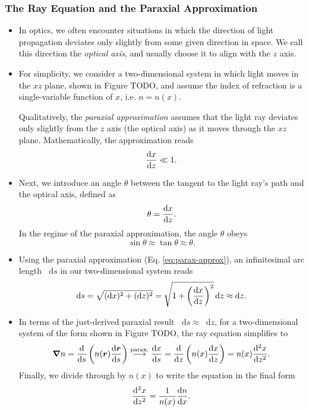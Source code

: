 \documentclass[11pt, a4paper]{article}
\newcommand{\diff}{\mathop{}\!\mathrm{d}} %
\renewcommand{\vec}[1]{\bm{#1}} %
\renewcommand{\r}{\vec{r}}  %
\begin{document}
\subsubsection{The Ray Equation and the Paraxial Approximation}
\begin{itemize}
    \item In optics, we often encounter situations in which the direction of light propagation deviates only slightly from some given direction in space. We call this direction the \textit{optical axis}, and usually choose it to align with the $ z $ axis.

    \item For simplicity, we consider a two-dimensional system in which light moves in the $ xz $ plane, shown in Figure TODO, and assume the index of refraction is a single-variable function of $ x $, i.e. $ n = n(x) $.

    Qualitatively, the \textit{paraxial approximation} assumes that the light ray deviates only slightly from the $ z $ axis (the optical axis) as it moves through the $ xz $ plane. Mathematically, the approximation reads
    \begin{equation}
        \dv{x}{z} \ll 1. \label{eq:parax-approx}
    \end{equation}

    \item Next, we introduce an angle $ \theta $ between the tangent to the light ray's path and the optical axis, defined as
    \begin{equation*}
        \theta = \dv{x}{z}.
    \end{equation*}
    In the regime of the paraxial approximation, the angle $ \theta $ obeys
    \begin{equation*}
        \sin \theta \approx \tan \theta \approx \theta.
    \end{equation*}

    \item Using the paraxial approximation (Eq. \ref{eq:parax-approx}), an infinitesimal arc length $ \diff s $ in our two-dimensional system reads
    \begin{equation*}
        \diff s = \sqrt{(\diff x)^{2} + (\diff z)^{2}} = \sqrt{1 + \left( \dv{x}{z} \right)^{2}} \diff z \approx \diff z.
    \end{equation*}
    
    \item In terms of the just-derived paraxial result $ \diff s \approx \diff z $, for a two-dimensional system of the form shown in Figure TODO, the ray equation simplifies to
    \begin{equation*}
        \grad n = \dv{s} \left( n(\r) \dv{\r}{s} \right) \stackrel{\text{parax.}}{\longrightarrow} \dv{x}{s} = \dv{z}\left( n(x) \dv{x}{z} \right) = n(x) \dv[2]{x}{z}.
    \end{equation*}
    Finally, we divide through by $ n(x) $ to write the equation in the final form
    \begin{equation}
        \dv[2]{x}{z} = \frac{1}{n(x)} \dv{n}{x}. \label{eq:ray-equation-parax}
    \end{equation}
    
\end{itemize}
\end{document}
